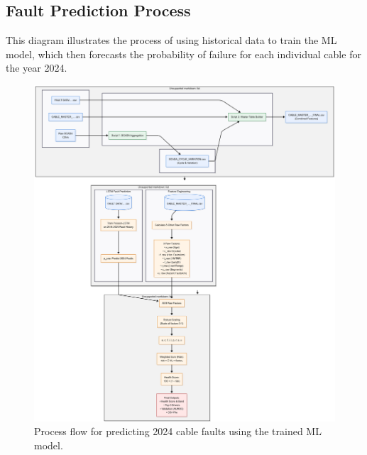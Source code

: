 \documentclass[a4paper,11pt]{article}
\begin{document}
\subsection{Fault Prediction Process}
This diagram illustrates the process of using historical data to train the ML model, which then forecasts the probability of failure for each individual cable for the year 2024.
\begin{figure}[h!]
    \centering
    \includegraphics[width=1.1\linewidth, keepaspectratio]{fffff.png}
    \caption{Process flow for predicting 2024 cable faults using the trained ML model.}
\end{figure}
\end{document}
